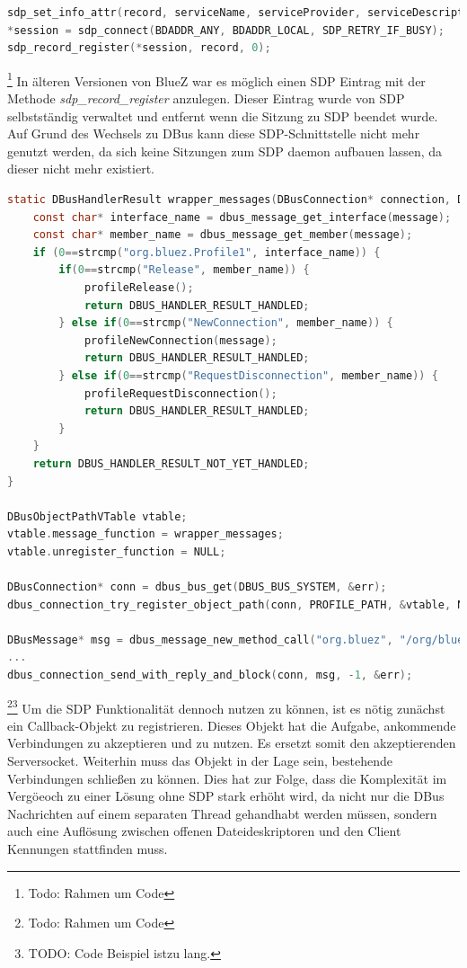 \documentclass[12pt,a4paper]{article}
\begin{document}
        \begin{lstlisting}[language=C, caption=Veraltete Nutzung von SDP (Server: C)]
sdp_set_info_attr(record, serviceName, serviceProvider, serviceDescription);
*session = sdp_connect(BDADDR_ANY, BDADDR_LOCAL, SDP_RETRY_IF_BUSY);
sdp_record_register(*session, record, 0);
        \end{lstlisting}\footnote{Todo: Rahmen um Code}
        In älteren Versionen von BlueZ war es möglich einen SDP Eintrag mit der Methode {\it sdp\_record\_register} anzulegen. Dieser Eintrag wurde von SDP selbstständig verwaltet und entfernt wenn die Sitzung zu SDP beendet wurde. Auf Grund des Wechsels zu DBus kann diese SDP-Schnittstelle nicht mehr genutzt werden, da sich keine Sitzungen zum SDP daemon aufbauen lassen, da dieser nicht mehr existiert.
        \begin{lstlisting}[language=C, caption=DBus Nutzung von SDP (Server: C)]
static DBusHandlerResult wrapper_messages(DBusConnection* connection, DBusMessage* message, void* user_data) {
    const char* interface_name = dbus_message_get_interface(message);
    const char* member_name = dbus_message_get_member(message);
    if (0==strcmp("org.bluez.Profile1", interface_name)) {
        if(0==strcmp("Release", member_name)) {
            profileRelease();
            return DBUS_HANDLER_RESULT_HANDLED;
        } else if(0==strcmp("NewConnection", member_name)) {
            profileNewConnection(message);
            return DBUS_HANDLER_RESULT_HANDLED;
        } else if(0==strcmp("RequestDisconnection", member_name)) {
            profileRequestDisconnection();
            return DBUS_HANDLER_RESULT_HANDLED;
        }
    }
    return DBUS_HANDLER_RESULT_NOT_YET_HANDLED;
}

DBusObjectPathVTable vtable;
vtable.message_function = wrapper_messages;
vtable.unregister_function = NULL;              

DBusConnection* conn = dbus_bus_get(DBUS_BUS_SYSTEM, &err);
dbus_connection_try_register_object_path(conn, PROFILE_PATH, &vtable, NULL, &err);

DBusMessage* msg = dbus_message_new_method_call("org.bluez", "/org/bluez", "org.bluez.ProfileManager1", "RegisterProfile");
...
dbus_connection_send_with_reply_and_block(conn, msg, -1, &err);
        \end{lstlisting}\footnote{Todo: Rahmen um Code}\footnote{TODO: Code Beispiel istzu lang.}
        Um die SDP Funktionalität dennoch nutzen zu können, ist es nötig zunächst ein Callback-Objekt zu registrieren. Dieses Objekt hat die Aufgabe, ankommende Verbindungen zu akzeptieren und zu nutzen. Es ersetzt somit den akzeptierenden Serversocket. Weiterhin muss das Objekt in der Lage sein, bestehende Verbindungen schließen zu können. Dies hat zur Folge, dass die Komplexität im Vergöeoch zu einer Lösung ohne SDP stark erhöht wird, da nicht nur die DBus Nachrichten auf einem separaten Thread gehandhabt werden müssen, sondern auch eine Auflösung zwischen offenen Dateideskriptoren und den Client Kennungen stattfinden muss.
\end{document}
